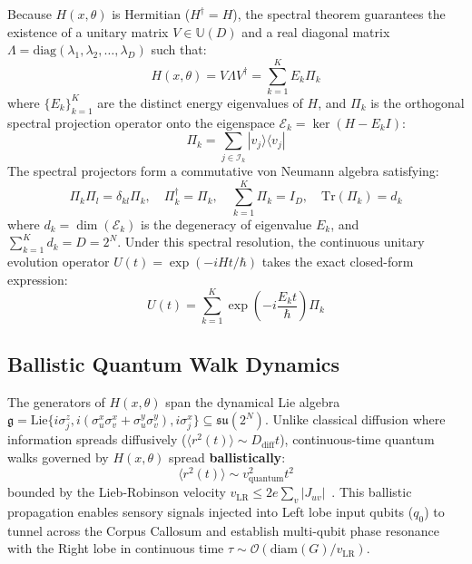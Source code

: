 \documentclass[10pt,twocolumn,3p]{article}
\begin{document}
Because $H(x, \theta)$ is Hermitian ($H^\dagger = H$), the spectral theorem guarantees the existence of a unitary matrix $V \in \mathbb{U}(D)$ and a real diagonal matrix $\Lambda = \text{diag}(\lambda_1, \lambda_2, \dots, \lambda_D)$ such that:
\begin{equation}
    H(x, \theta) = V \Lambda V^\dagger = \sum_{k=1}^K E_k \Pi_k
    \label{eq:spectral_decomp}
\end{equation}
where $\{E_k\}_{k=1}^K$ are the distinct energy eigenvalues of $H$, and $\Pi_k$ is the orthogonal spectral projection operator onto the eigenspace $\mathcal{E}_k = \ker(H - E_k I)$:
\begin{equation}
    \Pi_k = \sum_{j \in \mathcal{I}_k} |v_j\rangle \langle v_j|
\end{equation}
The spectral projectors form a commutative von Neumann algebra satisfying:
\begin{equation}
    \Pi_k \Pi_l = \delta_{kl} \Pi_k, \quad \Pi_k^\dagger = \Pi_k, \quad \sum_{k=1}^K \Pi_k = I_D, \quad \text{Tr}(\Pi_k) = d_k
\end{equation}
where $d_k = \dim(\mathcal{E}_k)$ is the degeneracy of eigenvalue $E_k$, and $\sum_{k=1}^K d_k = D = 2^N$. Under this spectral resolution, the continuous unitary evolution operator $U(t) = \exp(-i H t / \hbar)$ takes the exact closed-form expression:
\begin{equation}
    U(t) = \sum_{k=1}^K \exp\left( -i \frac{E_k t}{\hbar} \right) \Pi_k
    \label{eq:U_exact}
\end{equation}

\subsection{Ballistic Quantum Walk Dynamics}
\label{subsec:ballistic_walk}

The generators of $H(x, \theta)$ span the dynamical Lie algebra $\mathfrak{g} = \text{Lie}\{i \sigma_j^z, i(\sigma_u^x \sigma_v^x + \sigma_u^y \sigma_v^y), i \sigma_j^x\} \subseteq \mathfrak{su}(2^N)$. Unlike classical diffusion where information spreads diffusively ($\langle r^2(t) \rangle \sim D_{\text{diff}} t$), continuous-time quantum walks governed by $H(x, \theta)$ spread \textbf{ballistically}:
\begin{equation}
    \langle r^2(t) \rangle \sim v_{\text{quantum}}^2 t^2
\end{equation}
bounded by the Lieb-Robinson velocity $v_{\text{LR}} \le 2 e \sum_{v} |J_{uv}|$~\cite{lieb1972}. This ballistic propagation enables sensory signals injected into Left lobe input qubits ($q_0$) to tunnel across the Corpus Callosum and establish multi-qubit phase resonance with the Right lobe in continuous time $\tau \sim \mathcal{O}(\text{diam}(G) / v_{\text{LR}})$.
\end{document}
